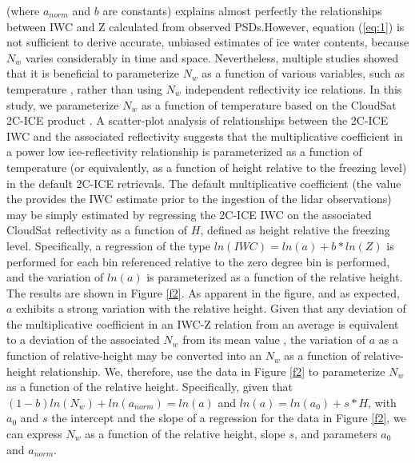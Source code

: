 \documentclass{ametsocV6.1}
\begin{document}
(where $a_{norm}$ and $b$ are constants) explains almost perfectly the relationships between IWC and Z calculated from observed PSDs.However, equation (\ref{eq:1}) is not  sufficient to derive accurate, unbiased estimates of ice water contents, because $N_w$ varies considerably in time and space. Nevertheless, multiple studies showed that it is beneficial to parameterize $N_w$ as a function  of various variables, such as temperature \citep{hogan2006retrieval, delanoe2008variational,deng2010tropical}, rather than using $N_w$ independent reflectivity ice relations.  In this study, we parameterize $N_w$ as a function of temperature based on the CloudSat 2C-ICE product \citep{deng2010tropical,deng2013evaluation}. A scatter-plot analysis of relationships between the 2C-ICE IWC and the associated reflectivity suggests that the multiplicative coefficient in a power low ice-reflectivity relationship is parameterized as a function of temperature (or equivalently, as a function of height relative to the freezing level) in the default 2C-ICE retrievals. The default multiplicative coefficient (the value the provides the IWC estimate prior to the ingestion of the lidar observations) may be simply estimated by regressing the 2C-ICE IWC on the associated CloudSat reflectivity as a function of $H$, defined as height relative the freezing level. Specifically, a regression of the type $ln(IWC)=ln(a)+b*ln(Z)$ is performed for each bin referenced relative to the zero degree bin is performed, and the variation of $ln(a)$ is parameterized as a function of the relative height.  The results are shown in Figure \ref{f2}. As apparent in the figure, and as expected, $a$ exhibits a strong variation with the relative height. Given that any deviation of the multiplicative coefficient in an IWC-Z relation from an average is equivalent to a deviation of the associated $N_w$ from its mean value \citep{ferreira2001,delanoe2014}, the variation of $a$ as a function of relative-height may be converted into an $N_w$ as a function of relative-height relationship.  We, therefore, use the data in Figure \ref{f2} to parameterize $N_w$ as a function of the relative height.  Specifically, given that $(1-b)ln(N_w)+ln(a_{norm})=ln(a)$ and $ln(a)=ln(a_0)+s*H$, with $a_0$ and $s$ the intercept and the slope of a regression for the data in Figure \ref{f2}, we can express $N_w$ as a function of the relative height, slope $s$, and parameters $a_0$ and $a_{norm}$.
\end{document}
